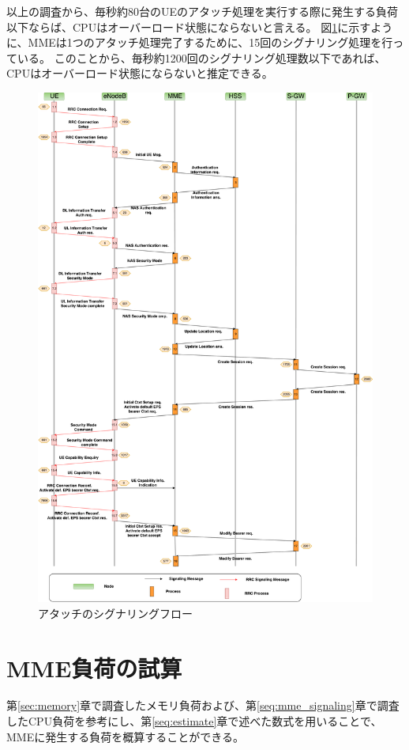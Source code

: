 \documentclass[a4j]{ujarticle}
\begin{document}
以上の調査から、毎秒約80台のUEのアタッチ処理を実行する際に発生する負荷以下ならば、CPUはオーバーロード状態にならないと言える。
図\ref{signaling}に示すように、MMEは1つのアタッチ処理完了するために、15回のシグナリング処理を行っている。
このことから、毎秒約1200回のシグナリング処理数以下であれば、CPUはオーバーロード状態にならないと推定できる。
\begin{figure}[htbp]
  \centering
  \includegraphics[width=0.9\hsize]{signaling.pdf}
  \caption{アタッチのシグナリングフロー}
  \label{signaling}
\end{figure}


\clearpage

\section{MME負荷の試算}
第\ref{sec:memory}章で調査したメモリ負荷および、第\ref{seq:mme_signaling}章で調査したCPU負荷を参考にし、第\ref{seq:estimate}章で述べた数式を用いることで、MMEに発生する負荷を概算することができる。
\end{document}
